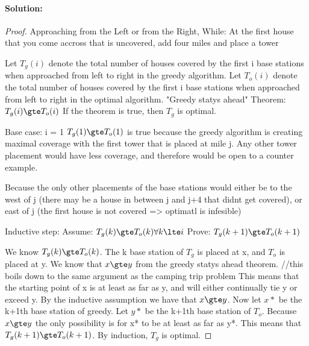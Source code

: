 \documentclass[12pt]{article}
\begin{document}
\paragraph{Solution:}
\begin{proof}
Approaching from the Left or from the Right,
While:
        At the first house that you come accross that is uncovered, add four miles and place a tower

Let $T_g(i)$ denote the total number of houses covered by the first i base stations when approached from left to right in the greedy algorithm.
Let $T_o(i)$ denote the total number of houses covered by the first i base stations when approached from left to right in the optimal algorithm.
"Greedy statys ahead"
Theorem: $T_g(i) \gte T_o(i)$
If the theorem is true, then $T_g$ is optimal.

Base case: i = 1
$T_g(1) \gte T_o(1)$ is true because the greedy algorithm is creating maximal coverage with the first tower that is placed at mile j.  Any other tower placement would have less coverage, and therefore would be open to a counter example.

Because the only other placements of the base stations would either be to the west of j (there may be a house in between j and j+4 that didnt get covered), or east of j (the first house is not covered => optimatl is infesible)

Inductive step:
        Assume: $T_g(k) \gte T_o(k) \forall k \lte i$
        Prove: $T_g(k+1) \gte T_o(k+1)$

We know $T_g(k) \gte T_o(k)$.
The k base station of $T_g$ is placed at x, and $T_o$ is placed at y.
We know that $x \gte y$ from the greedy statys ahead theorem.
//this boils down to the same argument as the camping trip problem
This means that the starting point of x is at least as far as y, and will either continually tie y or exceed y.
By the inductive assumption we have that $x \gte y$.  Now let $x*$ be the k+1th base station of greedy.  Let $y*$ be the k+1th base station of $T_o$.  Because $x \gte y$ the only possibility is for x* to be at least as far as y*.  This means that $T_g(k+1) \gte T_o(k+1)$.  By induction, $T_g$ is optimal.

\end{proof}
\end{document}
